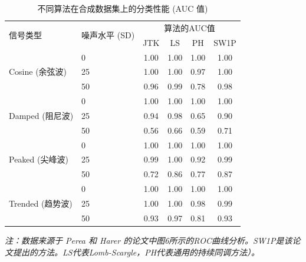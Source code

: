 \begin{table}[htbp]
    \centering
    \caption{不同算法在合成数据集上的分类性能 (AUC 值)}
    \label{tab:auc_results}
    \begin{tabular}{@{}llcccc@{}}
        \toprule
        \multirow{2}{*}{信号类型}          & \multirow{2}{*}{噪声水平 (SD)} & \multicolumn{4}{c}{算法的AUC值}                      \\
        \cmidrule(l){3-6}
                                       &                            & JTK                         & LS   & PH   & SW1P \\
        \midrule
        \multirow{3}{*}{Cosine (余弦波)}  & 0                          & 1.00                        & 1.00 & 1.00 & 1.00 \\
                                       & 25                         & 1.00                        & 1.00 & 0.97 & 1.00 \\
                                       & 50                         & 0.96                        & 0.99 & 0.78 & 0.98 \\
        \midrule
        \multirow{3}{*}{Damped (阻尼波)}  & 0                          & 1.00                        & 1.00 & 1.00 & 1.00 \\
                                       & 25                         & 0.94                        & 0.98 & 0.65 & 0.90 \\
                                       & 50                         & 0.56                        & 0.66 & 0.59 & 0.71 \\
        \midrule
        \multirow{3}{*}{Peaked (尖峰波)}  & 0                          & 1.00                        & 1.00 & 1.00 & 1.00 \\
                                       & 25                         & 0.99                        & 1.00 & 0.92 & 0.99 \\
                                       & 50                         & 0.72                        & 0.86 & 0.77 & 0.87 \\
        \midrule
        \multirow{3}{*}{Trended (趋势波)} & 0                          & 1.00                        & 1.00 & 1.00 & 1.00 \\
                                       & 25                         & 1.00                        & 1.00 & 0.98 & 0.99 \\
                                       & 50                         & 0.93                        & 0.97 & 0.81 & 0.93 \\
        \bottomrule
    \end{tabular}
    \footnotesize
    \newline
    \textit{注：数据来源于 Perea 和 Harer 的论文中图6所示的ROC曲线分析。SW1P是该论文提出的方法。LS代表Lomb-Scargle，PH代表通用的持续同调方法）。}
\end{table}


